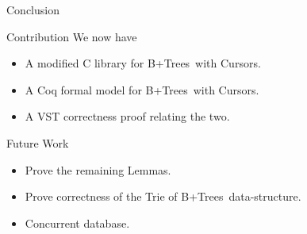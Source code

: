 \documentclass[page number,usenames,dvipsnames]{beamer}
\def\btrees{B+Trees}
\begin{document}
\begin{frame}{Conclusion}
  \begin{block}{Contribution}
    We now have
    \begin{itemize}
    \item A modified C library for \btrees\ with Cursors.
    \item A Coq formal model for \btrees\ with Cursors.
    \item A VST correctness proof relating the two.
    \end{itemize}
  \end{block}
  \vfill
  \begin{block}{Future Work}
    \begin{itemize}
    \item Prove the remaining Lemmas.
    \item Prove correctness of the Trie of \btrees\ data-structure.
    \item Concurrent database.
    \end{itemize}
  \end{block}
  
\end{frame}
\end{document}

